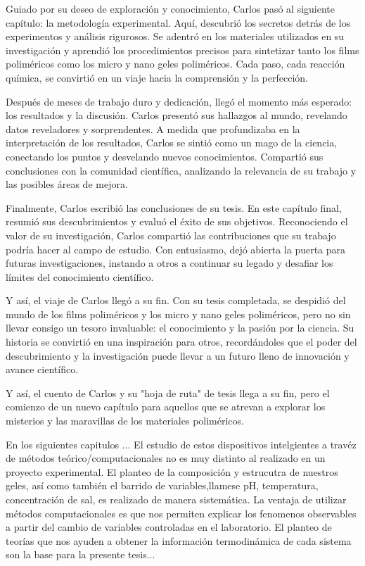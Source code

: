 Guiado por su deseo de exploración y conocimiento, Carlos pasó al siguiente capítulo: la metodología experimental. Aquí, descubrió los secretos detrás de los experimentos y análisis rigurosos. Se adentró en los materiales utilizados en su investigación y aprendió los procedimientos precisos para sintetizar tanto los films poliméricos como los micro y nano geles poliméricos. Cada paso, cada reacción química, se convirtió en un viaje hacia la comprensión y la perfección.

Después de meses de trabajo duro y dedicación, llegó el momento más esperado: los resultados y la discusión. Carlos presentó sus hallazgos al mundo, revelando datos reveladores y sorprendentes. A medida que profundizaba en la interpretación de los resultados, Carlos se sintió como un mago de la ciencia, conectando los puntos y desvelando nuevos conocimientos. Compartió sus conclusiones con la comunidad científica, analizando la relevancia de su trabajo y las posibles áreas de mejora.

Finalmente, Carlos escribió las conclusiones de su tesis. En este capítulo final, resumió sus descubrimientos y evaluó el éxito de sus objetivos. Reconociendo el valor de su investigación, Carlos compartió las contribuciones que su trabajo podría hacer al campo de estudio. Con entusiasmo, dejó abierta la puerta para futuras investigaciones, instando a otros a continuar su legado y desafiar los límites del conocimiento científico.

Y así, el viaje de Carlos llegó a su fin. Con su tesis completada, se despidió del mundo de los films poliméricos y los micro y nano geles poliméricos, pero no sin llevar consigo un tesoro invaluable: el conocimiento y la pasión por la ciencia. Su historia se convirtió en una inspiración para otros, recordándoles que el poder del descubrimiento y la investigación puede llevar a un futuro lleno de innovación y avance científico.

Y así, el cuento de Carlos y su "hoja de ruta" de tesis llega a su fin, pero el comienzo de un nuevo capítulo para aquellos que se atrevan a explorar los misterios y las maravillas de los materiales poliméricos.



En los siguientes capitulos ...
El estudio de estos dispositivos intelgientes a trav\'ez de m\'etodos te\'orico/computacionales no es muy distinto al realizado en un proyecto experimental. El planteo de la composici\'on y estrucutra de nuestros geles, as\'i como tambi\'en el barrido de variables,llamese pH, temperatura, concentraci\'on de sal, es realizado de manera sistem\'atica.
La ventaja de utilizar m\'etodos computacionales es que nos permiten explicar los fenomenos observables a partir del cambio de variables controladas en el laboratorio.
El planteo de teor\'ias que nos ayuden a obtener la informaci\'on termodin\'amica de cada sistema son la base para la presente tesis... 



